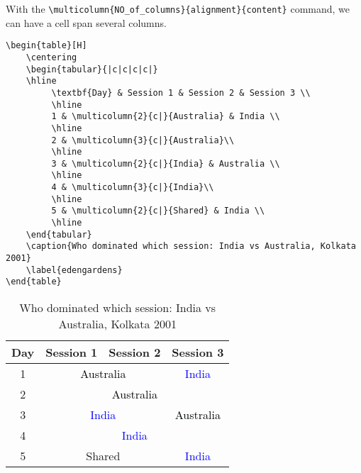 \documentclass[12pt, letterpaper]{article}
\theoremstyle{remark}
\begin{document}
With the \verb!\multicolumn{NO_of_columns}{alignment}{content}! command, we can have a cell span several columns.

\begin{lstlisting}
\begin{table}[H]
    \centering
    \begin{tabular}{|c|c|c|c|}
    \hline
         \textbf{Day} & Session 1 & Session 2 & Session 3 \\
         \hline
         1 & \multicolumn{2}{c|}{Australia} & India \\
         \hline
         2 & \multicolumn{3}{c|}{Australia}\\
         \hline
         3 & \multicolumn{2}{c|}{India} & Australia \\
         \hline
         4 & \multicolumn{3}{c|}{India}\\
         \hline
         5 & \multicolumn{2}{c|}{Shared} & India \\
         \hline
    \end{tabular}
    \caption{Who dominated which session: India vs Australia, Kolkata 2001}
    \label{edengardens}
\end{table}
\end{lstlisting}



\begin{table}[H]
    \centering
    \begin{tabular}{|c|c|c|c|}
    \hline
         \textbf{Day} & Session 1 & Session 2 & Session 3 \\
         \hline
         1 & \multicolumn{2}{c|}{\textcolor[wave]{600}{Australia}} & \textcolor{blue}{India} \\
         \hline
         2 & \multicolumn{3}{c|}{\textcolor[wave]{600}{Australia}}\\
         \hline
         3 & \multicolumn{2}{c|}{\textcolor{blue}{India}} & \textcolor[wave]{600}{Australia} \\
         \hline
         4 & \multicolumn{3}{c|}{\textcolor{blue}{India}}\\
         \hline
         5 & \multicolumn{2}{c|}{Shared} & \textcolor{blue}{India} \\
         \hline
    \end{tabular}
    \caption{Who dominated which session: India vs Australia, Kolkata 2001}
    \label{edengardens}
\end{table}
\end{document}
